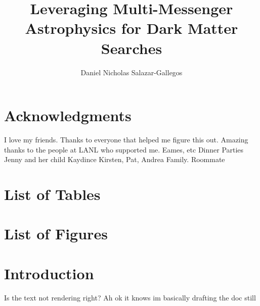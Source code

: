\documentclass[a4paper, 12pt]{article}
\title{Leveraging Multi-Messenger Astrophysics for Dark Matter Searches}
\author[1]{Daniel Nicholas Salazar-Gallegos}
\affil[1]{HAWC}
\affil[1]{IC3}
\begin{document}
\maketitle

\pagebreak


\pagebreak

\section{Acknowledgments}
I love my friends.
Thanks to everyone that helped me figure this out.
Amazing thanks to the people at LANL who supported me.
Eames, etc
Dinner Parties
Jenny and her child Kaydince
Kirsten, Pat, Andrea
Family.
Roommate

\pagebreak

\tableofcontents

\pagebreak

\section{List of Tables\label{sec:lo_Tbl}}

\pagebreak

\section{List of Figures\label{sec:lo_Fig}}

\pagebreak

\section{Introduction\label{sec:intro}}
Is the text not rendering right? Ah ok it knows im basically drafting the doc still
\end{document}
